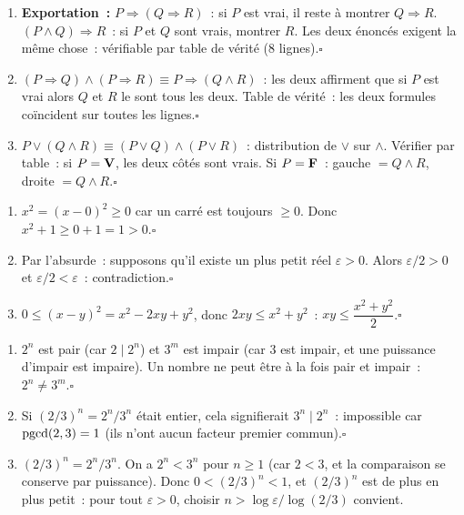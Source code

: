 
\begin{enumerate}
  \item \textbf{Exportation~:} $P\Rightarrow(Q\Rightarrow R)$~:
        si $P$ est vrai, il reste \`a montrer $Q\Rightarrow R$.
        $(P\land Q)\Rightarrow R$~: si $P$ et $Q$ sont vrais, montrer $R$.
        Les deux \'enonc\'es exigent la m\^eme chose~: v\'erifiable par table de v\'erit\'e (8 lignes).\hfill$\square$
  \item $(P\Rightarrow Q)\land(P\Rightarrow R)\equiv P\Rightarrow(Q\land R)$~:
        les deux affirment que si $P$ est vrai alors $Q$ et $R$ le sont tous les deux.
        Table de v\'erit\'e~: les deux formules co\"incident sur toutes les lignes.\hfill$\square$
  \item $P\lor(Q\land R)\equiv(P\lor Q)\land(P\lor R)$~:
        distribution de $\lor$ sur $\land$.
        V\'erifier par table~: si $P=\textbf{V}$, les deux c\^ot\'es sont vrais.
        Si $P=\textbf{F}$~: gauche $=Q\land R$, droite $=Q\land R$.\hfill$\square$
\end{enumerate}


\begin{enumerate}
  \item $x^2=(x-0)^2\geq0$ car un carr\'e est toujours $\geq0$.
        Donc $x^2+1\geq0+1=1>0$.\hfill$\square$
  \item Par l'absurde~: supposons qu'il existe un plus petit r\'eel $\varepsilon>0$.
        Alors $\varepsilon/2>0$ et $\varepsilon/2<\varepsilon$~: contradiction.\hfill$\square$
  \item $0\leq(x-y)^2=x^2-2xy+y^2$, donc $2xy\leq x^2+y^2$~:
        $xy\leq\dfrac{x^2+y^2}{2}$.\hfill$\square$
\end{enumerate}


\begin{enumerate}
  \item $2^n$ est pair (car $2\mid2^n$) et $3^m$ est impair (car $3$ est impair,
        et une puissance d'impair est impaire). Un nombre ne peut \^etre
        \`a la fois pair et impair~: $2^n\ne3^m$.\hfill$\square$
  \item Si $(2/3)^n=2^n/3^n$ \'etait entier, cela signifierait $3^n\mid2^n$~:
        impossible car $\operatorname{pgcd}(2,3)=1$ (ils n'ont aucun facteur premier commun).\hfill$\square$
  \item $(2/3)^n=2^n/3^n$. On a $2^n<3^n$ pour $n\geq1$ (car $2<3$, et la
        comparaison se conserve par puissance). Donc $0<(2/3)^n<1$, et
        $(2/3)^n$ est de plus en plus petit~: pour tout $\varepsilon>0$,
        choisir $n>\log\varepsilon/\log(2/3)$ convient.
\end{enumerate}

